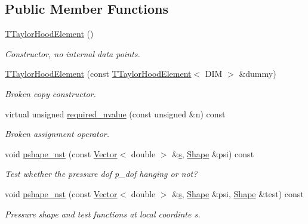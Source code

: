 \subsection*{Public Member Functions}
\begin{DoxyCompactItemize}
\item 
\hyperlink{classoomph_1_1TTaylorHoodElement_a0b7cf5da6700fe2566cdf69ea5af3506}{T\+Taylor\+Hood\+Element} ()
\begin{DoxyCompactList}\small\item\em Constructor, no internal data points. \end{DoxyCompactList}\item 
\hyperlink{classoomph_1_1TTaylorHoodElement_a2fb2e282044fd3f85a78b1b916335612}{T\+Taylor\+Hood\+Element} (const \hyperlink{classoomph_1_1TTaylorHoodElement}{T\+Taylor\+Hood\+Element}$<$ D\+IM $>$ \&dummy)
\begin{DoxyCompactList}\small\item\em Broken copy constructor. \end{DoxyCompactList}\item 
virtual unsigned \hyperlink{classoomph_1_1TTaylorHoodElement_a43c139cf8d078cb943024d2c0673a02b}{required\+\_\+nvalue} (const unsigned \&n) const
\begin{DoxyCompactList}\small\item\em Broken assignment operator. \end{DoxyCompactList}\item 
void \hyperlink{classoomph_1_1TTaylorHoodElement_a78814850aa0ff675479394d0dda7d1e8}{pshape\+\_\+nst} (const \hyperlink{classoomph_1_1Vector}{Vector}$<$ double $>$ \&\hyperlink{cfortran_8h_ab7123126e4885ef647dd9c6e3807a21c}{s}, \hyperlink{classoomph_1_1Shape}{Shape} \&psi) const
\begin{DoxyCompactList}\small\item\em Test whether the pressure dof p\+\_\+dof hanging or not? \end{DoxyCompactList}\item 
void \hyperlink{classoomph_1_1TTaylorHoodElement_a73ffecb519bf03336ea6cfe2eb7567df}{pshape\+\_\+nst} (const \hyperlink{classoomph_1_1Vector}{Vector}$<$ double $>$ \&\hyperlink{cfortran_8h_ab7123126e4885ef647dd9c6e3807a21c}{s}, \hyperlink{classoomph_1_1Shape}{Shape} \&psi, \hyperlink{classoomph_1_1Shape}{Shape} \&test) const
\begin{DoxyCompactList}\small\item\em Pressure shape and test functions at local coordinte s. \end{DoxyCompactList}\item 

\end{DoxyCompactItemize}

